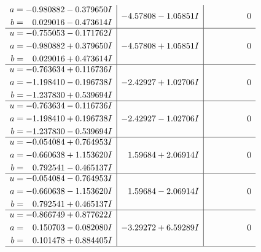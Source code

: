 \documentclass[1p]{elsarticle_modified}
\theoremstyle{definition}
\begin{document}
$$\begin{array}{c|c|c}
\begin{aligned}
a &= -0.980882 - 0.379650 I \\
b &= \phantom{-}0.029016 - 0.473614 I\end{aligned}
 & -4.57808 - 1.05851 I & \phantom{-0.000000 } 0 \\ \hline\begin{aligned}
u &= -0.755053 - 0.171762 I \\
a &= -0.980882 + 0.379650 I \\
b &= \phantom{-}0.029016 + 0.473614 I\end{aligned}
 & -4.57808 + 1.05851 I & \phantom{-0.000000 } 0 \\ \hline\begin{aligned}
u &= -0.763634 + 0.116736 I \\
a &= -1.198410 - 0.196738 I \\
b &= -1.237830 + 0.539694 I\end{aligned}
 & -2.42927 + 1.02706 I & \phantom{-0.000000 } 0 \\ \hline\begin{aligned}
u &= -0.763634 - 0.116736 I \\
a &= -1.198410 + 0.196738 I \\
b &= -1.237830 - 0.539694 I\end{aligned}
 & -2.42927 - 1.02706 I & \phantom{-0.000000 } 0 \\ \hline\begin{aligned}
u &= -0.054084 + 0.764953 I \\
a &= -0.660638 + 1.153620 I \\
b &= \phantom{-}0.792541 - 0.465137 I\end{aligned}
 & \phantom{-}1.59684 + 2.06914 I & \phantom{-0.000000 } 0 \\ \hline\begin{aligned}
u &= -0.054084 - 0.764953 I \\
a &= -0.660638 - 1.153620 I \\
b &= \phantom{-}0.792541 + 0.465137 I\end{aligned}
 & \phantom{-}1.59684 - 2.06914 I & \phantom{-0.000000 } 0 \\ \hline\begin{aligned}
u &= -0.866749 + 0.877622 I \\
a &= \phantom{-}0.150703 - 0.082080 I \\
b &= \phantom{-}0.101478 + 0.884405 I\end{aligned}
 & -3.29272 + 6.59289 I & \phantom{-0.000000 } 0\\
 \hline 
 \end{array}$$\newpage$$\begin{array}{c|c|c}  

\end{array}$$
\end{document}
